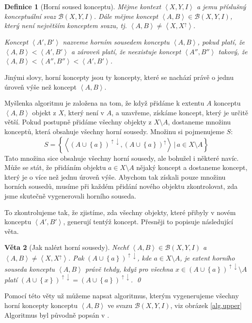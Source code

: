 \documentclass{article}
\newcommand{\sep}{\,|\,}
\newcommand{\adds}[1]{\left\{#1\right\}}
\newcommand{\addsp}[1]{\left<#1\right>}
\newcommand{\context}{\addsp{X, Y, I}}
\newcommand{\lattice}{\mathcal{B}(X, Y, I)}
\newcommand{\up}{^{\uparrow}}
\newcommand{\updown}{^{\uparrow\downarrow}}
\newtheorem{mydef}{Definice}
\newtheorem{theorem}[mydef]{Věta}
\begin{document}
\begin{mydef}[Horní soused konceptu]
Mějme kontext $\context$ a jemu příslušný konceptuální svaz $\lattice$. Dále mějme koncept $\addsp{A, B} \in \lattice$, který není největším konceptem svazu, tj. $\addsp{A, B}\ne\addsp{X, X\up}$. 

Koncept $\addsp{A', B'}$ nazveme horním sousedem konceptu $\addsp{A, B}$, pokud platí, že $\addsp{A, B} < \addsp{A', B'}$ a zároveň platí, že neexistuje koncept $\addsp{A'', B''}$ takový, že $\addsp{A, B} < \addsp{A'', B''} < \addsp{A', B'}$.
\end{mydef}

Jinými slovy, horní koncepty jsou ty koncepty, které se nachází právě o jednu úroveň výše než koncept $\addsp{A, B}$.

Myšlenka algoritmu je založena na tom, že když přidáme k extentu $A$ konceptu $\addsp{A, B}$ objekt z $X$, který není v $A$, a uzavřeme, získáme koncept, který je určitě větší. Pokud postupně přidáme všechny objekty z $X \setminus A$, dostaneme množinu konceptů, která obsahuje všechny horní sousedy. Množinu si pojmenujeme $S$:
$$
S=\adds{\addsp{(A\cup \adds{a})\updown, (A\cup \adds{a})\up}\sep a\in X\setminus A}
$$
Tato množina sice obsahuje všechny horní sousedy, ale bohužel i některé navíc. Může se stát, že přidáním objektu $a\in X\setminus A$  nějaký koncept a dostaneme koncept, který je o více než jednu úroveň výše. Abychom tak získali pouze množinu horních sousedů, musíme při každém přidání nového objektu zkontrolovat, zda jsme skutečně vygenerovali horního souseda. 

To zkontrolujeme tak, že zjistíme, zda všechny objekty, které přibyly v novém konceptu $\addsp{A', B'}$, generují tentýž koncept. Přesněji to popisuje následující věta.

\begin{theorem}[Jak nalézt horní sousedy]
Nechť $\addsp{A, B} \in \lattice$ a $\addsp{A, B}\ne\addsp{X, X\up}$. Pak $(A\cup\adds{a})\updown$, kde $a\in X\setminus A$, je extent horního souseda konceptu $\addsp{A, B}$ právě tehdy, když pro všechna $x\in(A\cup\adds{a})\updown\setminus A$ platí $(A\cup\adds{x})\updown=(A\cup\adds{a})\updown$.
\qed\end{theorem}

Pomocí této věty už můžeme napsat algoritmus, kterým vygenerujeme všechny horní koncepty konceptu $\addsp{A, B}$ ve svazu $\lattice$, viz obrázek \ref{alg.upper} Algoritmus byl původně popsán v \cite{lindig}.
\end{document}
